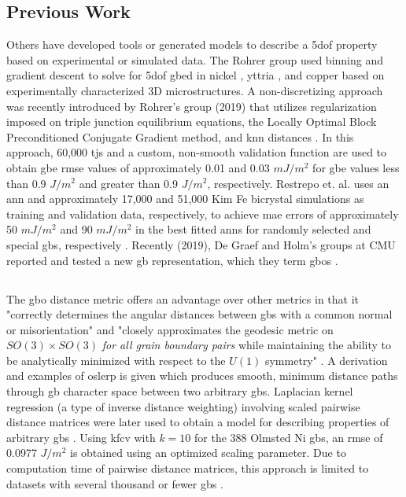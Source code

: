 \documentclass[preprint,12pt]{elsarticle}
\begin{document}
\subsection{Previous Work}
Others have developed tools or generated models to describe a \gls{5dof} property based on experimental or simulated data. The Rohrer group used binning and gradient descent to solve for \gls{5dof} \gls{gbed} in nickel \cite{liRelativeGrainBoundary2009}, yttria \cite{dillonCharacterizationGrainboundaryCharacter2009}, and copper \cite{randleFiveparameterGrainBoundary2008} based on experimentally characterized 3D microstructures. A non-discretizing approach was recently introduced by Rohrer's group (2019) that utilizes regularization imposed on triple junction equilibrium equations, the Locally Optimal Block Preconditioned Conjugate Gradient method, and \gls{knn} distances \cite{shenDeterminingGrainBoundary2019}. In this approach, 60,000 \glspl{tj} and a custom, non-smooth validation function are used to obtain \gls{gbe} \gls{rmse} values of approximately 0.01 and 0.03 $mJ/m^2$ for \gls{gbe} values less than 0.9 $J/m^2$ and greater than 0.9 $J/m^2$, respectively. Restrepo et. al. uses an \gls{ann} and approximately 17,000 and 51,000 Kim Fe bicrystal simulations \cite{kimIdentificationSchemeGrain2011} as training and validation data, respectively, to achieve \gls{mae} errors of approximately 50 $mJ/m^2$ and 90 $mJ/m^2$ in the best fitted \glspl{ann} for randomly selected and special \glspl{gb}, respectively \cite{echeverrirestrepoUsingArtificialNeural2014}. Recently (2019), De Graef and Holm's groups at CMU reported and tested a new \gls{gb} representation, which they term \glspl{gbo} \cite{francisGeodesicOctonionMetric2019,chesserLearningGrainBoundary2020}.

\subsection{}
The \gls{gbo} distance metric offers an advantage over other metrics in that it "correctly determines the angular distances between \glspl{gb} with a common normal or misorientation" and "closely approximates the geodesic metric on $SO(3) \times SO(3)$ \textit{for all grain boundary pairs} while maintaining the ability to be analytically minimized with respect to the $U(1)$ symmetry" \cite{francisGeodesicOctonionMetric2019}. A derivation and examples of \gls{oslerp} is given which produces smooth, minimum distance paths through \gls{gb} character space between two arbitrary \glspl{gb}. Laplacian kernel regression (a type of inverse distance weighting) involving scaled pairwise distance matrices were later used to obtain a model for describing properties of arbitrary \glspl{gb} \cite{chesserLearningGrainBoundary2020}. Using \gls{kfcv} with $k=10$ for the 388 Olmsted Ni \glspl{gb}, an \gls{rmse} of 0.0977 $J/m^2$ is obtained using an optimized scaling parameter. Due to computation time of pairwise distance matrices, this approach is limited to datasets with several thousand or fewer \glspl{gb} \cite{chesserLearningGrainBoundary2020}.
\end{document}
